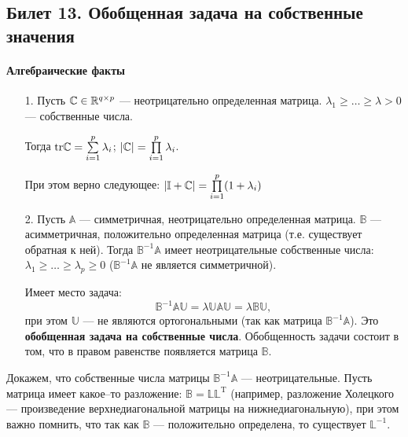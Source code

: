 \subsection{Билет 13. Обобщенная задача на собственные значения}
\paragraph{Алгебраические факты}
\begin{itemize}
\item[1.] Пусть $\mathbb{C} \in \mathbb{R}^{q \times p}$ --- неотрицательно определенная матрица. $\lambda_1 \geq \dots \geq \lambda > 0$ --- собственные числа.

Тогда $\mathrm {tr} \mathbb{C} = \sum \limits_{i = 1}^{p} \lambda_i$; $|\mathbb{C}| = \prod \limits_{i = 1}^p \lambda_i$.

При этом верно следующее: $|\mathbb{I} + \mathbb{C}| = \prod \limits_{i = 1}^p (1 + \lambda_i)$
\item[2.] Пусть $\mathbb{A}$ --- симметричная, неотрицательно определенная матрица. $\mathbb{B}$ --- асимметричная, положительно определенная матрица (т.е. существует обратная к ней).
Тогда $\mathbb{B}^{-1}\mathbb{A}$ имеет неотрицательные собственные числа: $\lambda_1 \geq \dots \geq \lambda_p \geq 0$ ($\mathbb{B}^{-1}\mathbb{A}$ не является симметричной).

Имеет место задача:
%
\begin{equation*}
\mathbb{B}^{-1}\mathbb{A}\mathbb{U} = \lambda \mathbb{U} \mathbb{A}\mathbb{U} = \lambda \mathbb{B} \mathbb{U},
\end{equation*}
%
при этом $\mathbb{U}$ --- не являются ортогональными (так как матрица $\mathbb{B}^{-1}\mathbb{A}$). Это \textbf{обобщенная задача на собственные числа}. Обобщенность задачи состоит в том, что в правом равенстве появляется матрица $\mathbb{B}$.
\end{itemize}

Докажем, что собственные числа матрицы $\mathbb{B}^{-1}\mathbb{A}$ --- неотрицательные.
Пусть матрица имеет какое--то разложение: $\mathbb{B} = \mathbb{L}\mathbb{L}^{\mathrm{T}}$ (например, разложение Холецкого --- произведение верхнедиагональной матрицы на нижнедиагональную), при этом важно помнить, что так как $\mathbb{B}$ --- положительно определена, то существует $\mathbb{L}^{-1}$.

